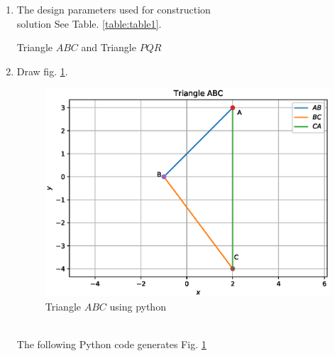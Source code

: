 \renewcommand{\theequation}{\theenumi}
\begin{enumerate}[label=\thesection.\arabic*.,ref=\thesection.\theenumi]




\item The design parameters used for construction \\
solution See Table. \ref{table:table1}.
\begin{table}[ht!]
\centering

\caption{Triangle $ABC$ and Triangle $PQR$}
\label{table:table1}	
\end{table} 


\item Draw fig. \ref{fig:triangle_1}.
\begin{figure}[!ht]
\centering
\includegraphics[width=\columnwidth]{./codes/triangle1.eps}
\caption{Triangle $ABC$ using python}
\label{fig:triangle_1}
\end{figure} \\
\solution The  following Python code generates Fig. \ref{fig:triangle_1}


\end{enumerate}
